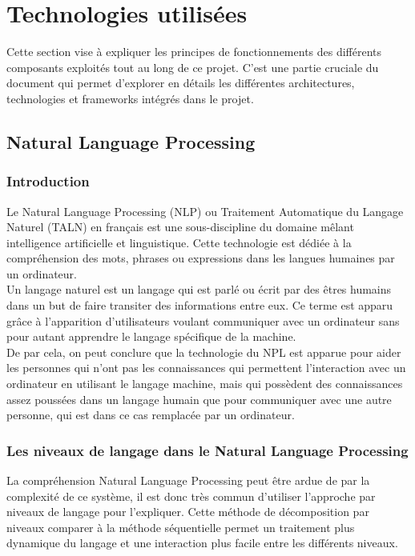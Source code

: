 \documentclass{rapport}
\begin{document}
\newpage
\section{Technologies utilisées}
\label{TechnoUse}
Cette section vise à expliquer les principes de fonctionnements des différents composants exploités tout au long de ce projet. C'est une partie cruciale du document qui permet d'explorer en détails les différentes architectures, technologies et frameworks intégrés dans le projet.
\subsection{Natural Language Processing}
\label{subsec:NLP}
\subsubsection{Introduction}
Le Natural Language Processing (NLP) ou Traitement Automatique du Langage Naturel (TALN) en français est une sous-discipline du domaine mêlant intelligence artificielle et linguistique. Cette technologie est dédiée à la compréhension des mots, phrases ou expressions dans les langues humaines par un ordinateur.\\

Un langage naturel est un langage qui est parlé ou écrit par des êtres humains dans un but de faire transiter des informations entre eux. Ce terme est apparu grâce à l'apparition d'utilisateurs voulant communiquer avec un ordinateur sans pour autant apprendre le langage spécifique de la machine. \\

De par cela, on peut conclure que la technologie du NPL est apparue pour aider les personnes qui n'ont pas les connaissances qui permettent l'interaction avec un ordinateur en utilisant le langage machine, mais qui possèdent des connaissances assez poussées dans un langage humain que pour communiquer avec une autre personne, qui est dans ce cas remplacée par un ordinateur. 
\subsubsection{Les niveaux de langage dans le Natural Language Processing}
La compréhension Natural Language Processing peut être ardue de par la complexité de ce système, il est donc très commun d'utiliser l'approche par niveaux de langage pour l'expliquer. Cette méthode de décomposition par niveaux comparer à la méthode séquentielle permet un traitement plus dynamique du langage et une interaction plus facile entre les différents niveaux.\\
\end{document}

